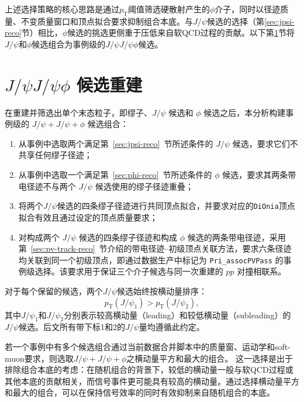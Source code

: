 上述选择策略的核心思路是通过$p_{\mathrm T}$阈值筛选硬散射产生的$\phi$介子，同时以径迹质量、不变质量窗口和顶点拟合要求抑制组合本底。与$J/\psi$候选的选择（第\ref{sec:jpsi-reco}节）相比，$\phi$候选的挑选更侧重于压低来自软QCD过程的贡献。以下第\ref{sec:triplet-reco}节将$J/\psi$和$\phi$候选组合为事例级的$J/\psi J/\psi\phi$候选。

\section{\texorpdfstring{$J/\psi J/\psi\phi$}{J/psi J/psi phi} 候选重建}
\label{sec:triplet-reco}

在重建并筛选出单个末态粒子，即缪子、$J/\psi$ 候选和 $\phi$ 候选之后，本分析构建事例级的 $J/\psi + J/\psi + \phi$ 候选组合：

\begin{enumerate}
  \item 从事例中选取两个满足第~\ref{sec:jpsi-reco}~节所述条件的 $J/\psi$ 候选，要求它们不共享任何缪子径迹；
  \item 从事例中选取一个满足第~\ref{sec:phi-reco}~节所述条件的 $\phi$ 候选，要求其两条带电径迹不与两个 $J/\psi$ 候选使用的缪子径迹重叠；
  \item 将两个$J/\psi$候选的四条缪子径迹进行共同顶点拟合，并要求对应的\texttt{DiOnia}顶点拟合有效且通过设定的顶点质量要求；
  \item 对构成两个 $J/\psi$ 候选的四条缪子径迹和构成 $\phi$ 候选的两条带电径迹，采用第~\ref{sec:pv-track-reco}~节介绍的带电径迹--初级顶点关联方法，要求六条径迹均关联到同一个初级顶点，即通过数据生产中标记为 \texttt{Pri\_assocPVPass} 的事例级选择。该要求用于保证三个介子候选与同一次重建的 $pp$ 对撞相联系。
\end{enumerate}

对于每个保留的候选，两个$J/\psi$候选始终按横动量排序：
\begin{equation}
  p_{\mathrm{T}}(J/\psi_1) > p_{\mathrm{T}}(J/\psi_2),
\end{equation}
其中$J/\psi_1$和$J/\psi_2$分别表示较高横动量（leading）和较低横动量（subleading）的$J/\psi$候选。后文所有带下标1和2的$J/\psi$量均遵循此约定。

若一个事例中有多个候选组合通过当前数据合并脚本中的质量窗、运动学和soft-muon要求，则选取$J/\psi+J/\psi+\phi$之横动量平方和最大的组合。
这一选择是出于排除组合本底的考虑：在随机组合的背景下，较低的横动量一般与软QCD过程或其他本底的贡献相关，而信号事件更可能具有较高的横动量。通过选择横动量平方和最大的组合，可以在保持信号效率的同时有效抑制来自随机组合的本底。

